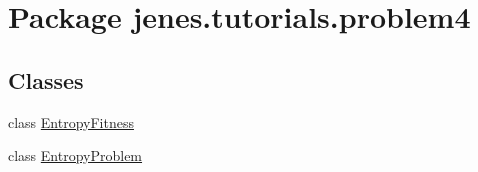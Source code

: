 \hypertarget{namespacejenes_1_1tutorials_1_1problem4}{\section{Package jenes.\-tutorials.\-problem4}
\label{namespacejenes_1_1tutorials_1_1problem4}
}
\subsection*{Classes}
\begin{DoxyCompactItemize}
\item 
class \hyperlink{classjenes_1_1tutorials_1_1problem4_1_1_entropy_fitness}{Entropy\-Fitness}
\item 
class \hyperlink{classjenes_1_1tutorials_1_1problem4_1_1_entropy_problem}{Entropy\-Problem}
\end{DoxyCompactItemize}
